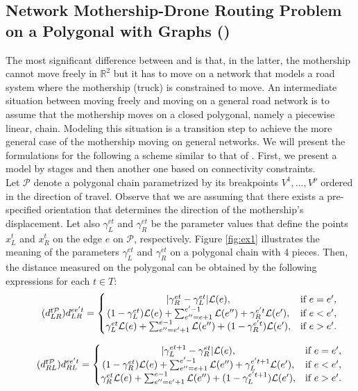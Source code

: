 \subsection{Network Mothership-Drone Routing Problem on a Polygonal with Graphs (\PMD)}
\noindent
The most significant difference between \AMD\xspace and  \PMD\xspace is that, in the latter, the mothership cannot move freely in $\mathbb R^2$ but it has to move on a network that models a road system where the mothership (truck) is constrained to move. An intermediate situation between moving freely and moving on a general road network is to assume that the mothership moves on a closed polygonal, namely a piecewise linear, chain. Modeling this situation is a transition step to achieve the more general case of the mothership moving on general networks. We will present the formulations for the \PMD\xspace  following a scheme similar to that of \AMD. First, we present a model by stages and then another one based on connectivity constraints.\\
\noindent
Let $\mathcal P$ denote a polygonal chain parametrized by its breakpoints $V^1, \ldots, V^p$ ordered in the direction of travel. Observe that we are assuming that there exists a pre-specified orientation that determines the direction of the mothership's displacement. Let also $\gamma_L^{et}$ and $\gamma_R^{et}$ be the parameter values that define the points $x_L^t$ and $x_R^t$ on the edge $e$ on $\mathcal P$, respectively. Figure \ref{fig:ex1} illustrates the meaning of the parameters $\gamma_L^{et}$ and $\gamma_R^{et}$ on a polygonal chain with 4 pieces. Then, the distance measured on the polygonal can be obtained by the following expressions for each $t\in T$:
\begin{equation}\tag{$d^{t\mathcal P}_{LR}$}\label{eq:dLRPt}
d_{LR}^{ee't} = \left\{\begin{matrix}
|\gamma_R^{et} - \gamma_L^{et}|\mathcal L(e), & \text{if } e = e',\\
(1 - \gamma_L^{et})\mathcal L(e) + \sum_{e'' = e+1}^{e'-1}\mathcal L(e'') + \gamma_{R}^{e't}\mathcal L(e'), & \text{if } e < e', \\
\gamma_L^{et}\mathcal L(e) + \sum_{e'' = e'+1}^{e-1}\mathcal L(e'') + (1-\gamma_{R}^{e't})\mathcal L(e'), & \text{if } e > e'.
\end{matrix}\right.
\end{equation}

\begin{equation}\tag{$d^{t\mathcal P}_{RL}$}\label{eq:dRLPt}
d_{RL}^{ee't} = \left\{\begin{matrix}
|\gamma_{L}^{et+1}-\gamma_R^{et}|\mathcal L(e), & \text{if } e = e',\\
(1 - \gamma_R^{et})\mathcal L(e) + \sum_{e'' = e+1}^{e'-1}\mathcal L(e'') + \gamma_{L}^{e't+1}\mathcal L(e'), & \text{if } e < e',\\
\gamma_R^{et}\mathcal L(e) + \sum_{e'' = e'+1}^{e-1}\mathcal L(e'') + (1-\gamma_{L}^{e't+1})\mathcal L(e'), & \text{if } e > e'.\\
\end{matrix}\right.
\end{equation}

